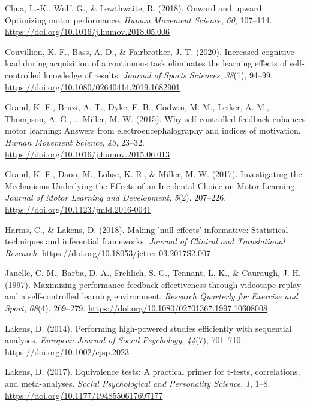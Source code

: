 \documentclass[
  english,
  doc, donotrepeattitle,floatsintext]{apa7}
\newlength{\cslhangindent}
\newlength{\cslentryspacingunit} %
\newenvironment{CSLReferences}[2] %
 {%
  \setlength{\parindent}{0pt}
  \ifodd #1
  \let\oldpar\par
  \def\par{\hangindent=\cslhangindent\oldpar}
  \fi
  \setlength{\parskip}{#2\cslentryspacingunit}
 }%
 {}
\begin{document}
\begin{CSLReferences}{1}{0}
\leavevmode{}%
Chua, L.-K., Wulf, G., \& Lewthwaite, R. (2018). Onward and upward: Optimizing motor performance. \emph{Human Movement Science}, \emph{60}, 107--114. \url{https://doi.org/10.1016/j.humov.2018.05.006}

\leavevmode{}%
Couvillion, K. F., Bass, A. D., \& Fairbrother, J. T. (2020). Increased cognitive load during acquisition of a continuous task eliminates the learning effects of self-controlled knowledge of results. \emph{Journal of Sports Sciences}, \emph{38}(1), 94--99. \url{https://doi.org/10.1080/02640414.2019.1682901}

\leavevmode{}%
Grand, K. F., Bruzi, A. T., Dyke, F. B., Godwin, M. M., Leiker, A. M., Thompson, A. G., \ldots{} Miller, M. W. (2015). Why self-controlled feedback enhances motor learning: Answers from electroencephalography and indices of motivation. \emph{Human Movement Science}, \emph{43}, 23--32. \url{https://doi.org/10.1016/j.humov.2015.06.013}

\leavevmode{}%
Grand, K. F., Daou, M., Lohse, K. R., \& Miller, M. W. (2017). Investigating the Mechanisms Underlying the Effects of an Incidental Choice on Motor Learning. \emph{Journal of Motor Learning and Development}, \emph{5}(2), 207--226. \url{https://doi.org/10.1123/jmld.2016-0041}

\leavevmode{}%
Harms, C., \& Lakens, D. (2018). Making 'null effects' informative: Statistical techniques and inferential frameworks. \emph{Journal of Clinical and Translational Research}. \url{https://doi.org/10.18053/jctres.03.2017S2.007}

\leavevmode{}%
Janelle, C. M., Barba, D. A., Frehlich, S. G., Tennant, L. K., \& Cauraugh, J. H. (1997). Maximizing performance feedback effectiveness through videotape replay and a self-controlled learning environment. \emph{Research Quarterly for Exercise and Sport}, \emph{68}(4), 269--279. \url{https://doi.org/10.1080/02701367.1997.10608008}

\leavevmode{}%
Lakens, D. (2014). Performing high-powered studies efficiently with sequential analyses. \emph{European Journal of Social Psychology}, \emph{44}(7), 701--710. \url{https://doi.org/10.1002/ejsp.2023}

\leavevmode{}%
Lakens, D. (2017). Equivalence tests: A practical primer for t-tests, correlations, and meta-analyses. \emph{Social Psychological and Personality Science}, \emph{1}, 1--8. \url{https://doi.org/10.1177/1948550617697177}


\end{CSLReferences}
\end{document}
